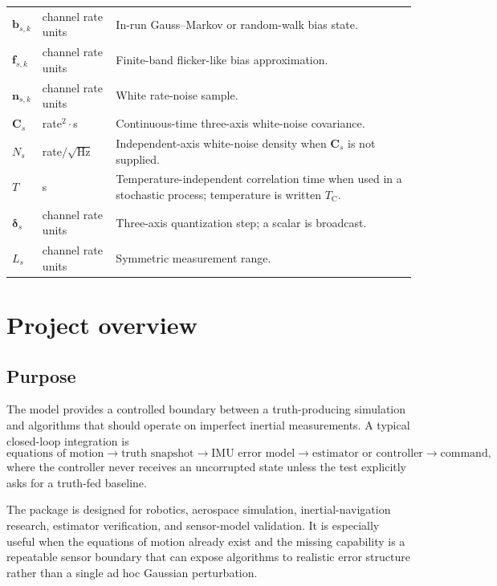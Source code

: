 \documentclass[11pt,oneside,headings=big]{scrreprt}
\newcommand{\vect}[1]{\bm{#1}}
\newcommand{\mat}[1]{\bm{#1}}
\begin{document}
\begin{longtable}{@{}L{1.35in}L{1.45in}L{3.35in}@{}}
        $\vect b_{s,k}$ & channel rate units & In-run Gauss--Markov or random-walk bias state. \\
        $\vect f_{s,k}$ & channel rate units & Finite-band flicker-like bias approximation. \\
        $\vect n_{s,k}$ & channel rate units & White rate-noise sample. \\
        $\mat C_s$ & rate$^2\!\cdot$\si{\second} & Continuous-time three-axis white-noise covariance. \\
        $N_s$ & rate$/\sqrt{\si{\hertz}}$ & Independent-axis white-noise density when $\mat C_s$ is not supplied. \\
        $T$ & \si{\second} & Temperature-independent correlation time when used in a stochastic process; temperature is written $T_{\mathrm C}$. \\
        $\vect\delta_s$ & channel rate units & Three-axis quantization step; a scalar is broadcast. \\
        $L_s$ & channel rate units & Symmetric measurement range. \\
        \bottomrule
    \end{longtable}

    \clearpage


    \chapter{Project overview}
    \label{chap:overview}


    \section{Purpose}
    The model provides a controlled boundary between a truth-producing simulation and
    algorithms that should operate on imperfect inertial measurements. A typical
    closed-loop integration is
    \begin{equation}
        \text{equations of motion}
        \longrightarrow \text{truth snapshot}
        \longrightarrow \text{IMU error model}
        \longrightarrow \text{estimator or controller}
        \longrightarrow \text{command},
    \end{equation}
    where the controller never receives an uncorrupted state unless the test
    explicitly asks for a truth-fed baseline.

    The package is designed for robotics, aerospace simulation, inertial-navigation
    research, estimator verification, and sensor-model validation. It is especially
    useful when the equations of motion already exist and the missing capability is a
    repeatable sensor boundary that can expose algorithms to realistic error
    structure rather than a single ad hoc Gaussian perturbation.
\end{document}
